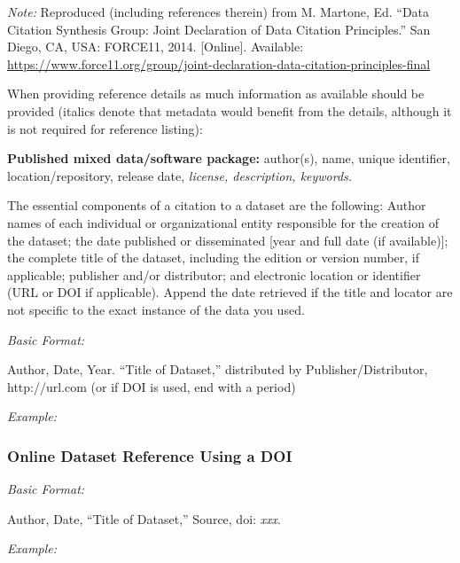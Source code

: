 \documentclass[10pt]{article}
\newcommand*{\guidelabel}[1]{\par\vspace{-4pt}\hspace*{22pt}\textit{#1}\par\vspace{-\parskip}}
\begin{document}
\textit{Note:} Reproduced (including references therein) from M. Martone, Ed. “Data Citation Synthesis Group: Joint Declaration of Data Citation Principles.” San Diego, CA, USA: FORCE11, 2014. [Online]. Available: \url{https://www.force11.org/group/joint-declaration-data-citation-principles-final}

When providing reference details as much information as available should be provided (italics denote that metadata would benefit from the details, although it is not required for reference listing):

\begin{guideitems}
  \item \textbf{Published mixed data/software package:} author(s), name, unique identifier, location/repository, release date, \textit{license, description, keywords.}
\end{guideitems}

The essential components of a citation to a dataset are the following: Author names of each individual or organizational entity responsible for the creation of the dataset; the date published or disseminated [year and full date (if available)]; the complete title of the dataset, including the edition or version number, if applicable; publisher and/or distributor; and electronic location or identifier (URL or DOI if applicable). Append the date retrieved if the title and locator are not specific to the exact instance of the data you used.

\guidelabel{Basic Format:}
\begin{guideitems}
  \item Author, Date, Year. “Title of Dataset,” distributed by Publisher/Distributor, http://url.com (or if DOI is used, end with a period)
\end{guideitems}
\guidelabel{Example:}
\begin{guideitems}
  \item {}
\end{guideitems}

\subsubsection{Online Dataset Reference Using a DOI}
\guidelabel{Basic Format:}
\begin{guideitems}
  \item Author, Date, “Title of Dataset,” Source, doi: \textit{xxx}.
\end{guideitems}
\guidelabel{Example:}
\begin{guideitems}
  \item {}
\end{guideitems}
\end{document}

